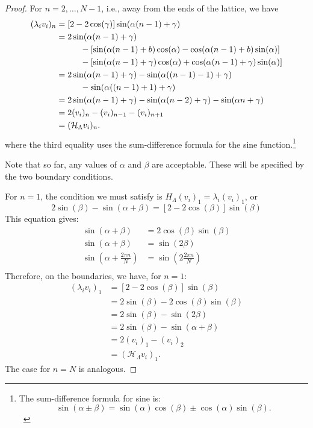 \documentclass{article}
\newcommand{\hl}{H_\Lambda}
\numberwithin{equation}{section}
\numberwithin{theorem}{section}
\numberwithin{proposition}{section}
\numberwithin{lemma}{section}
\numberwithin{corollary}{section}
\numberwithin{definition}{section}
\begin{document}
\begin{proof}
	For $n = 2, \ldots, N-1$, i.e., away from the ends of the lattice, we have
	\begin{align*}
	(\lambda_i v_i)_n &= [2 - 2\cos(\beta)] \sin(\alpha (n-1) + \beta) \\
		&= 2\sin(\alpha (n-1) + \beta) \\
		&\hspace{10 mm} - [\sin(\alpha(n-1)+b) \cos(\alpha) - \cos(\alpha(n-1)+b) \sin(\alpha)] \\
		&\hspace{10 mm} - [\sin(\alpha(n-1)+\beta) \cos(\alpha) + \cos(\alpha(n-1)+\beta) \sin(\alpha)] \\
		&= 2\sin(\alpha (n-1) + \beta) - \sin(\alpha ((n-1)-1) + \beta) \\
		&\hspace{10 mm} - \sin(\alpha ((n-1)+1) + \beta) \\
		&= 2\sin(\alpha (n-1) + \beta) - \sin(\alpha (n-2) + \beta) - \sin(\alpha n + \beta) \\
		&= 2(v_i)_n - (v_i)_{n-1} - (v_i)_{n+1} \\		
		&= (\mathcal{H}_\Lambda v_i)_n.
	\end{align*}
	where the third equality uses the sum-difference formula for the sine function.\footnote{The sum-difference formula for sine is:
		\[
		\sin(\alpha \pm \beta) = \sin(\alpha) \cos(\beta) \pm \cos(\alpha) \sin(\beta).
		\]\
	}
		
Note that so far, any values of $\alpha$ and $\beta$ are acceptable. These will be specified by the two boundary conditions.

For $n=1$, the condition we must satisfy is $\hl (v_i)_1 = \lambda_i (v_i)_1$, or
	\begin{equation}
		2\sin(\beta) - \sin(\alpha+\beta) =  [2 - 2\cos(\beta)] \sin(\beta)
	\end{equation}
This equation gives:
\begin{align*}
	\sin(\alpha+\beta) &= 2\cos(\beta)\sin(\beta) \\
	\sin(\alpha+\beta) &= \sin(2\beta) \\
	\sin\left(\alpha + \frac{2\pi n}{N} \right) &= \sin\left(2 \frac{2\pi n}{N} \right) \\
\end{align*}
Therefore, on the boundaries, we have, for $n = 1$:
	\begin{align*}
		(\lambda_i v_i)_1 &= [2 - 2\cos(\beta)] \sin(\beta) \\
			&= 2\sin(\beta) - 2\cos(\beta) \sin(\beta) \\
			&= 2\sin(\beta) - \sin(2\beta) \\
			&= 2\sin(\beta) - \sin(\alpha + \beta) \\
			&= 2(v_i)_1 - (v_i)_2 \\	
			&= (\mathcal{H}_\Lambda v_i)_1.
	\end{align*}
The case for $n = N$ is analogous.
\end{proof}
\end{document}

